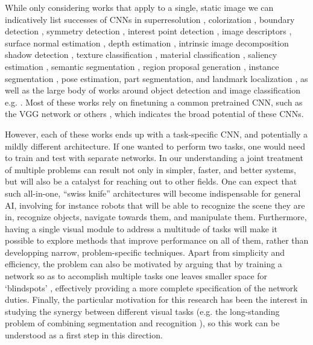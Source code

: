 \documentclass[10pt,twocolumn,letterpaper]{article}
\begin{document}
While only considering works that apply to a single, static image  we can indicatively list successes of CNNs in superresolution \cite{DongLHT16},  colorization \cite{LarssonMS16}, boundary detection \cite{shi15,ganin2014n,hed,iclr16},  symmetry detection \cite{ShenZJWZB16}, interest point detection \cite{eccv16lift}, image descriptors \cite{ZagoruykoK15,simo2015deepdesc,HanLJSB15}, 
surface normal estimation \cite{Eigen15,WangFG15,BansalRG16}, depth estimation \cite{Eigen15,LiuSL14,LiuSLR15}, intrinsic image decomposition \cite{NMY:ICCV:2015} shadow detection \cite{yago16},  texture classification \cite{CimpoiMKV16}, material classification \cite{BellUSB15}, saliency estimation \cite{ZhaoOLW15,saliencycvpr16},  semantic segmentation \cite{farabet2013learning,LongSD15,ChenPK0Y16}, region proposal generation \cite{RenHGS15,PinheiroCD15,GidarisK16}, instance segmentation \cite{hariharan2014simultaneous,PinheiroCD15,DaiHS15}, pose estimation, part segmentation, and landmark localization \cite{ZhangLLT14,ToshevS14,TsogkasSemanticPart15,ChenYWXY15,PfisterCZ15,NewellYD16,BelagiannisZ16,InsafutdinovPAA16,WeiRKS16}, as well as the large body of works around object detection and image classification e.g. \cite{KrizhevskyNIPS2013, SEZM+14, simonyan2014very, SzegedyLJSRAEVR14,girshick2014rcnn,RenHGS15,Girshick15,HeZRS15,DaiLHS16}. 
Most of these works rely on finetuning a common pretrained CNN, such as the VGG network \cite{simonyan2014very} or others \cite{KrizhevskyNIPS2013,HeZRS15}, which  indicates the broad potential of these CNNs.

 However, each of these works ends up with a task-specific CNN, and potentially a mildly different architecture. If one wanted to perform two tasks, one would need to train and test with separate networks. In our understanding a joint treatment of multiple problems can result not only in simpler, faster, and better systems, but will also be a catalyst for reaching out to other fields. One can expect that such all-in-one, ``swiss knife'' architectures will become indispensable for general AI, involving for instance   robots that will be able to recognize the scene they are in, recognize objects, navigate towards them, and manipulate them. Furthermore, having a single visual module to address a multitude of tasks will make it  possible to explore methods that  improve performance on all of them, rather than developping narrow, problem-specific techniques. Apart from simplicity and efficiency, the problem can also be motivated  by arguing that by training a network so as to accomplish multiple tasks one leaves smaller space for `blindspots' \cite{blindspots}, effectively providing a more complete specification of the network duties. 
 Finally, the particular motivation for this research has been the interest in studying the synergy between different visual tasks (e.g. the long-standing problem of combining segmentation and recognition  \cite{Keeler90,mumf94b,BottouBL97,TCYZ03,KoMa05,KTZ05,MaireYP11}), so this work can be understood as a first step in this direction. 
	
\end{document}
